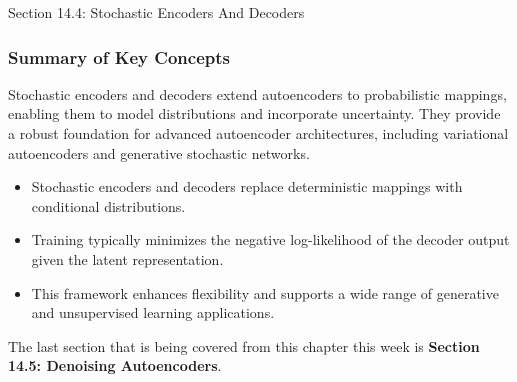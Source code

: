 \begin{notes}{Section 14.4: Stochastic Encoders And Decoders}
    \subsubsection*{Summary of Key Concepts}
    
    Stochastic encoders and decoders extend autoencoders to probabilistic mappings, enabling them to model distributions and incorporate uncertainty. They provide a robust foundation for advanced 
    autoencoder architectures, including variational autoencoders and generative stochastic networks.
    
    \begin{highlight}
        \begin{itemize}
            \item Stochastic encoders and decoders replace deterministic mappings with conditional distributions.
            \item Training typically minimizes the negative log-likelihood of the decoder output given the latent representation.
            \item This framework enhances flexibility and supports a wide range of generative and unsupervised learning applications.
        \end{itemize}
    \end{highlight}
\end{notes}

The last section that is being covered from this chapter this week is \textbf{Section 14.5: Denoising Autoencoders}.

